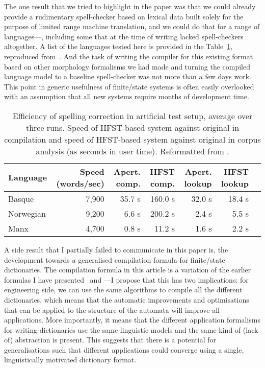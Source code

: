 \documentclass[officiallayout]{unihelcompling}
\begin{document}
The one result that we tried to highlight in the paper was that we could
already provide a rudimentary spell-checker based on lexical data built solely
for the purpose of limited range machine translation, and we could do that for
a range of languages---, including some that at the time
of writing lacked spell-checkers altogether. A list of the languages tested
here is provided in the Table~\ref{table:lrec-2012-repro}, reproduced
from~. And the task of writing the compiler
for this existing format based on other morphology formalisms we had made and
turning the compiled language model to a baseline spell-checker was not more
than a few days work. This point in generic usefulness of finite\-/state
systems is often easily overlooked with an assumption that all new systems
require months of development time.

\begin{table}
    \centering
    \begin{scriptsize}
\begin{tabular}{|l|r|r||r|r||r|r|}
\hline
\bf Language & \bf Speed (words/sec) & \bf Apert. comp. & \bf HFST comp. & \bf Apert. lookup & \bf HFST lookup \\
\hline
Basque       &  7,900  & 35.7 s & 160.0  s & 32.0 s & 18.4 s \\
Norwegian    &  9,200  & 6.6 s  & 200.2 s  & 2.4 s  & 5.5  s \\
Manx         &  4,700  & 0.8 s  & 11.2  s  & 1.6 s  & 2.2  s \\
\hline
\end{tabular}
\end{scriptsize}
  \caption{Efficiency of spelling correction in artificial test setup, average 
  over three runs. Speed of HFST-based system against original in compilation
  and speed of HFST-based system against original in corpus analysis (as
  seconds in user time).  Reformatted from .
  \label{table:lrec-2012-repro}}
\end{table}

A side result that I partially failed to communicate in this paper is, the
development towards a generalised compilation formula for finite\-/state
dictionaries. The compilation formula in this article is a variation of the
earlier formulas I have presented~\citep{linden2009hfst} and
---I propose that this has two implications:
for engineering side, we can use the same algorithms to compile all the
different dictionaries, which means that the automatic improvements and
optimisations that can be applied to the structure of the automata will improve
all applications. More importantly, it means that the different application
formalisms for writing dictionaries use the same linguistic models and the same
kind of (lack of) abstraction is present. This suggests that there is a
potential for generalisations such that different applications could converge
using a single, linguistically motivated dictionary format.
\end{document}
